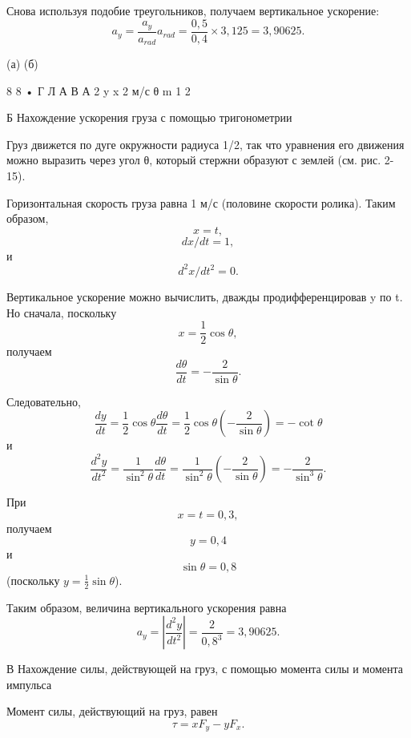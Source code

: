 \documentclass[10pt,oneside]{article}
\newcommand{\TipsRunning}[1]{\par\vspace{2bp}{\centering\footnotesize #1\par}\vspace{2bp}}
\begin{document}
Снова используя подобие треугольников, получаем вертикальное ускорение: \[a_y = \frac{a_y}{a_{rad}} a_{rad} = \frac{0,5}{0,4} \times 3,125 = 3,90625.\]\par

(а) (б)\par

8 8 • Г Л А В А  2 y x 2 м/с θ m 1 2\par

\TipsRunning{Р И С У Н О К  2 - 1 5}

Б Нахождение ускорения груза с помощью тригонометрии\par

Груз движется по дуге окружности радиуса 1/2, так что уравнения его движения можно выразить через угол θ, который стержни образуют с землей (см. рис. 2-15).\par

Горизонтальная скорость груза равна 1 м/с (половине скорости ролика). Таким образом, \[x = t,\] \[dx/dt = 1,\] и \[d^2x/dt^2 = 0.\]\par

Вертикальное ускорение можно вычислить, дважды продифференцировав y по t. Но сначала, поскольку \[x = \frac{1}{2} \cos\theta,\] получаем \[\frac{d\theta}{dt} = -\frac{2}{\sin\theta}.\]\par

Следовательно, \[\frac{dy}{dt} = \frac{1}{2} \cos\theta \frac{d\theta}{dt} = \frac{1}{2} \cos\theta \left(-\frac{2}{\sin\theta}\right) = -\cot\theta\] и \[\frac{d^2y}{dt^2} = \frac{1}{\sin^2\theta} \frac{d\theta}{dt} = \frac{1}{\sin^2\theta} \left(-\frac{2}{\sin\theta}\right) = -\frac{2}{\sin^3\theta}.\]\par

При \[x = t = 0,3,\] получаем \[y = 0,4\] и \[\sin\theta = 0,8\] (поскольку \(y = \frac{1}{2} \sin\theta\)).\par

Таким образом, величина вертикального ускорения равна \[a_y = \left| \frac{d^2y}{dt^2} \right| = \frac{2}{0,8^3} = 3,90625.\]\par

\TipsRunning{З А К О Н Ы  И  И Н Т У И Ц И Я • 8 9}

В Нахождение силы, действующей на груз, с помощью момента силы и момента импульса\par

Момент силы, действующий на груз, равен \[\tau = x F_y - y F_x.\]\par
\end{document}
